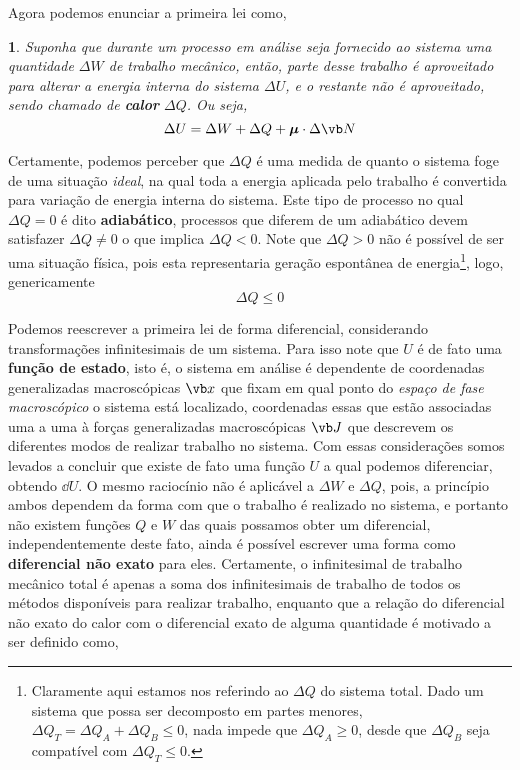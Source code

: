 \documentclass[twoside,reqno]{amsart}
\numberwithin{equation}{section}
\newcommand{\thistheoremname}{}
\newtheorem*{genericthm}{\thistheoremname}
\newenvironment{namedthm}[1]
  {\renewcommand{\thistheoremname}{#1}
   \begin{genericthm}}
  {\end{genericthm}}
\begin{document}
\begin{refsection}
Agora podemos enunciar a primeira lei como,

\begin{namedthm}{Primeira Lei}
    Suponha que durante um processo em análise seja fornecido ao sistema uma quantidade $\Delta W$ de trabalho mecânico, 
    então, parte desse trabalho é aproveitado para alterar a energia interna do sistema $\Delta U$, e o restante não é 
    aproveitado, sendo chamado de \textbf{calor} $\Delta Q$. Ou seja, \begin{equation}\Delta U=\Delta W+\Delta Q+\boldsymbol\mu\cdot\Delta\vb N\end{equation}
\end{namedthm}

Certamente, podemos perceber que $\Delta Q$ é uma medida de quanto o sistema foge de uma situação \emph{ideal}, na 
qual toda a energia aplicada pelo trabalho é convertida para variação de energia interna do sistema. Este tipo de 
processo no qual $\Delta Q=0$ é dito \textbf{adiabático}, processos que diferem de um adiabático devem satisfazer 
$\Delta Q\neq 0$ o que implica $\Delta Q<0$. Note que $\Delta Q>0$ não é possível de ser uma situação física, pois 
esta representaria geração espontânea de energia\footnote{Claramente aqui estamos nos referindo ao $\Delta Q$ do sistema 
total. Dado um sistema que possa ser decomposto em partes menores, $\Delta Q_T=\Delta Q_A+\Delta Q_B\leq 0$, nada 
impede que $\Delta Q_A\geq 0$, desde que $\Delta Q_B$ seja compatível com $\Delta Q_T\leq 0$.}, logo, genericamente 
$$\Delta Q\leq 0$$

Podemos reescrever a primeira lei de forma diferencial, considerando transformações infinitesimais de um sistema. Para isso 
note que $U$ é de fato uma \textbf{função de estado}, isto é, o sistema em análise é dependente de coordenadas 
generalizadas macroscópicas $\vb x$ que fixam em qual ponto do \emph{espaço de fase macroscópico} o sistema está 
localizado, coordenadas essas que estão associadas uma a uma à forças generalizadas macroscópicas $\vb J$ que descrevem 
os diferentes modos de realizar trabalho no sistema. Com essas considerações somos levados a concluir que existe de 
fato uma função $U$ a qual podemos diferenciar, obtendo $\dd{U}$. O mesmo raciocínio não é aplicável a $\Delta W$ 
e $\Delta Q$, pois, a princípio ambos dependem da forma com que o trabalho é realizado no sistema, e portanto não existem 
funções $Q$ e $W$ das quais possamos obter um diferencial, independentemente deste fato, ainda é 
possível escrever uma forma como \textbf{diferencial não exato} para eles. Certamente, o infinitesimal de trabalho mecânico 
total é apenas a soma dos infinitesimais de trabalho de todos os métodos disponíveis para realizar trabalho, enquanto que 
a relação do diferencial não exato do calor com o diferencial exato de alguma quantidade é motivado a ser definido como,


\end{refsection}
\end{document}
